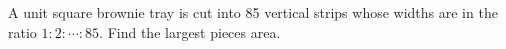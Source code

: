 A unit square brownie tray is cut into 85 vertical strips whose widths are in the ratio $1:2:\cdots:85$. Find the largest piece\textquotesingle s area.
